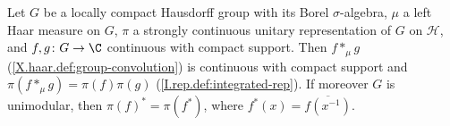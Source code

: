 Let $G$ be a locally compact Hausdorff group with its Borel $\sigma$-algebra, $\mu$ a left Haar measure on $G$, $\pi$ a
strongly continuous unitary representation of $G$ on $\mathcal H$, and $f,g\colon G\to\C$ continuous with compact support.
Then $f*_\mu g$ (\cref{X.haar.def:group-convolution}) is continuous with compact support and
$\pi(f*_\mu g)=\pi(f)\pi(g)$ (\cref{I.rep.def:integrated-rep}). If moreover $G$ is unimodular, then $\pi(f)^*=\pi(f^*)$, where
$f^*(x)=\overline{f(x^{-1})}$.
